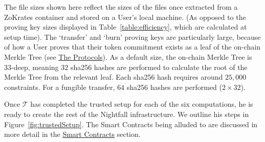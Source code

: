 The file sizes shown here reflect the sizes of the files once extracted from a ZoKrates container and stored on a User's local machine. (As opposed to the proving key sizes displayed in Table~\ref{table:efficiency}, which are calculated at setup time). The `transfer' and `burn' proving keys are particularly large, because of how a User proves that their token commitment exists as a leaf of the on-chain Merkle Tree (see \hyperref[part:theProtocols]{The Protocols}). As a default size, the on-chain Merkle Tree is 33-deep, meaning $32$ sha256 hashes are performed to calculate the root of the Merkle Tree from the relevant leaf. Each sha256 hash requires around $25,000$ constraints. For a fungible transfer, $64$ sha256 hashes are performed ($2 \times 32$).

Once $\mathcal{T}$ has completed the trusted setup for each of the six computations, he is ready to create the rest of the Nightfall infrastructure.
We outline his steps in Figure~\ref{fig:trustedSetup}. The Smart Contracts being alluded to are discussed in more detail in the \hyperref[sec:smartContracts]{Smart Contracts} section.
